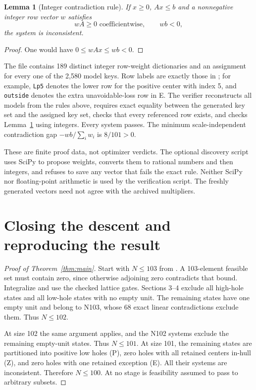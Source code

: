 \documentclass[11pt,a4paper]{article}
\newtheorem{lemma}[theorem]{Lemma}
\begin{document}
\begin{lemma}[Integer contradiction rule]\label{lem:certificate}
If $x\ge0$, $Ax\le b$ and a nonnegative integer row vector $w$ satisfies
\[
 wA\ge0\text{ coefficientwise},\qquad wb<0,
\]
the system is inconsistent.
\end{lemma}
\begin{proof}
One would have $0\le wAx\le wb<0$.
\end{proof}
The file  contains 189 distinct
integer row-weight dictionaries and an assignment for every one of the
2,580 model keys. Row labels are exactly those in
; for example, \texttt{Lp5} denotes the
lower row for the positive center with index 5, and \texttt{outside}
denotes the extra unavoidable-loss row in E.
The verifier reconstructs all models from the rules above, requires exact
equality between the generated key set and the assigned key set, checks
that every referenced row exists, and checks Lemma~\ref{lem:certificate}
using integers. Every system passes. The minimum scale-independent
contradiction gap $-wb/\sum_iw_i$ is $8/101>0$.

These are finite proof data, not optimizer verdicts. The optional
discovery script uses SciPy to propose weights, converts them to rational
numbers and then integers, and refuses to save any vector that fails the
exact rule. Neither SciPy nor floating-point arithmetic is used by the
verification script. The freshly generated vectors need not agree with
the archived multipliers.

\section{Closing the descent and reproducing the result}
\begin{proof}[Proof of Theorem~\ref{thm:main}]
Start with $N\le103$ from \cite{previous}. A 103-element feasible set
must contain zero, since otherwise adjoining zero contradicts that bound.
Integralize and use the checked lattice gates. Sections 3--4 exclude
all high-hole states and all low-hole states with no empty unit.
The remaining states have one empty unit and belong to N103, whose
68 exact linear contradictions exclude them. Thus $N\le102$.

At size 102 the same argument applies, and the N102 systems exclude the
remaining empty-unit states. Thus $N\le101$. At size 101, the remaining
states are partitioned into positive low holes (P), zero holes with all
retained centers in-hull (Z), and zero holes with one retained exception
(E). All their systems are inconsistent. Therefore $N\le100$.
At no stage is feasibility assumed to pass to arbitrary subsets.
\end{proof}
\end{document}

